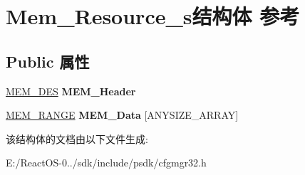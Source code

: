 \hypertarget{struct_mem___resource__s}{}\section{Mem\+\_\+\+Resource\+\_\+s结构体 参考}
\label{struct_mem___resource__s}
\subsection*{Public 属性}
\begin{DoxyCompactItemize}
\item 
\mbox{\label{struct_mem___resource__s_ac13243b372b6585f3b89625ead65393e}} 
\hyperlink{struct_mem___des__s}{M\+E\+M\+\_\+\+D\+ES} {\bfseries M\+E\+M\+\_\+\+Header}
\item 
\mbox{\label{struct_mem___resource__s_a006853a1e253e20cbf68ac74a0b8d282}} 
\hyperlink{struct_mem___range__s}{M\+E\+M\+\_\+\+R\+A\+N\+GE} {\bfseries M\+E\+M\+\_\+\+Data} \mbox{[}A\+N\+Y\+S\+I\+Z\+E\+\_\+\+A\+R\+R\+AY\mbox{]}
\end{DoxyCompactItemize}


该结构体的文档由以下文件生成\+:\begin{DoxyCompactItemize}
\item 
E\+:/\+React\+O\+S-\/0../sdk/include/psdk/cfgmgr32.\+h\end{DoxyCompactItemize}

